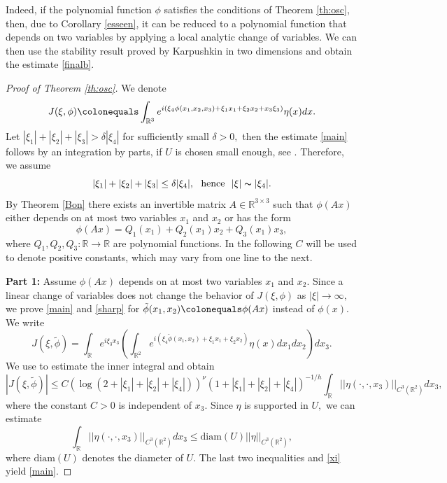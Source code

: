 \documentclass[a4paper, 11pt]{article}
\theoremstyle{plain}
\theoremstyle{definition}
\theoremstyle{lemma}
\theoremstyle{Remark}
\theoremstyle{proposition}
\theoremstyle{corollary}
\theoremstyle{example}
\theoremstyle{assumption}
\begin{document}
Indeed, if the polynomial function $\phi$ satisfies the conditions of Theorem \ref{th:osc}, then, due to Corollary \ref{esseen}, it can be reduced to a polynomial function that depends on two variables  by applying a local analytic  change of variables. We can then use the stability result proved by Karpushkin \cite{Kar} in two dimensions and obtain   the estimate \eqref{finalb}.\\


\begin{proof}[Proof of Theorem \ref{th:osc}]
We denote
$$J(\xi,\phi)\colonequals \int_{\mathbb{R}^3}e^{i(\xi_4\phi(x_1,x_2,x_3)+\xi_1x_1+\xi_2x_2+x_3\xi_3)} \eta(x)dx.$$
Let $|\xi_1|+|\xi_2|+|\xi_3|>\delta |\xi_4|$ for sufficiently small $\delta>0,$ then the estimate \eqref{main} follows by an integration by parts, if $U$ is chosen small enough, see \cite[Chapter VIII]{Stein}.
Therefore, we assume
\begin{equation}\label{xi}
|\xi_1|+|\xi_2|+|\xi_3|\leq \delta |\xi_4|,\,\,\,\,\text{hence}\,\,\,\,|\xi|\thicksim |\xi_4|.
\end{equation}
By Theorem \ref{Bon} there exists an invertible matrix $A\in \mathbb{R}^{3\times 3}$ such that
$ \phi(Ax)$ either depends on at most two variables $x_1$ and $x_2$ or has the form
$$\phi(Ax)=Q_1(x_1)+Q_2(x_1)x_2+Q_3(x_1)x_3,$$
where $Q_1, Q_2, Q_3:\mathbb{R}\to \mathbb{R}$ are polynomial functions.
 In the following  $C$ will be used to denote positive constants, which may vary from one line to the next.


\bigskip
\textbf{Part 1:} Assume $ \phi(Ax)$ depends  on at most two variables $x_1$ and $x_2$. Since a linear change of variables does not change the behavior of $J(\xi,\phi )$ as $|\xi|\to \infty,$ we  prove \eqref{main} and \eqref{sharp} for $ \tilde{\phi}(x_1,x_2)\colonequals \phi(Ax)$ instead of $\phi(x).$   We write
$$
J(\xi,\tilde{\phi})=\int_{\mathbb{R}} e^{i \xi_3x_3}\left(\int_{\mathbb{R}^2}e^{i(\xi_4\tilde{\phi}(x_1,x_2) +\xi_1x_1+\xi_2x_2)} \eta(x)dx_1dx_2\right)
dx_3.
$$
 We use \cite[Theorem 1.1]{Ik.Mu} to estimate the inner integral and obtain
$$|J(\xi,\tilde{\phi})| \leq C (\log(2+|\xi_1|+|\xi_2|+|\xi_4|))^{\nu}(1+|\xi_1|+|\xi_2|+|\xi_4|)^{-1/h}\int_{\mathbb{R}} ||\eta(\cdot, \cdot, x_3)||_{C^3(\mathbb{R}^2)}dx_3,$$
where the constant $C>0$ is independent of $x_3.$   Since   $\eta$ is supported in $U, $  we can estimate
$$\int_{\mathbb{R}} ||\eta(\cdot, \cdot, x_3)||_{C^3(\mathbb{R}^2)}dx_3\leq \mathrm{diam}(U)  ||\eta||_{C^3(\mathbb{R}^2)} ,$$
where $\mathrm{diam}(U)$ denotes the diameter of $U.$ The last two inequalities  and \eqref{xi} yield \eqref{main}.


\end{proof}
\end{document}
